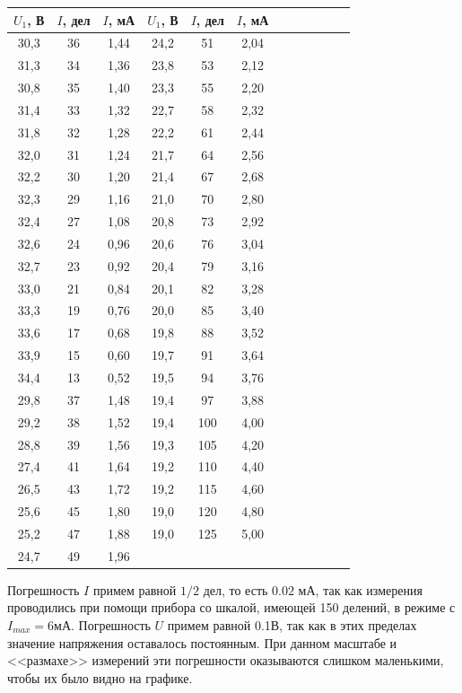 \documentclass[14pt]{article}
\begin{document}
\begin{center}
\begin{tabular}{|c|c|c|c|c|c|c|c|c|c|c|c|}
\hline
$U_1$, В&$I$, дел&$I$, мА&$U_1$, В&$I$, дел&$I$, мА\\
\hline
30,3&36&1,44&24,2&51&2,04\\
\hline
31,3&34&1,36&23,8&53&2,12\\
\hline
30,8&35&1,40&23,3&55&2,20\\
\hline
31,4&33&1,32&22,7&58&2,32\\
\hline
31,8&32&1,28&22,2&61&2,44\\
\hline
32,0&31&1,24&21,7&64&2,56\\
\hline
32,2&30&1,20&21,4&67&2,68\\
\hline
32,3&29&1,16&21,0&70&2,80\\
\hline
32,4&27&1,08&20,8&73&2,92\\
\hline
32,6&24&0,96&20,6&76&3,04\\
\hline
32,7&23&0,92&20,4&79&3,16\\
\hline
33,0&21&0,84&20,1&82&3,28\\
\hline
33,3&19&0,76&20,0&85&3,40\\
\hline
33,6&17&0,68&19,8&88&3,52\\
\hline
33,9&15&0,60&19,7&91&3,64\\
\hline
34,4&13&0,52&19,5&94&3,76\\
\hline
29,8&37&1,48&19,4&97&3,88\\
\hline
29,2&38&1,52&19,4&100&4,00\\
\hline
28,8&39&1,56&19,3&105&4,20\\
\hline
27,4&41&1,64&19,2&110&4,40\\
\hline
26,5&43&1,72&19,2&115&4,60\\
\hline
25,6&45&1,80&19,0&120&4,80\\
\hline
25,2&47&1,88&19,0&125&5,00\\
\hline
24,7&49&1,96&&&\\
\hline
\end{tabular}
\end{center}

\vspace{1cm}
Погрешность $I$ примем равной $1/2$ дел, то есть $0.02$ мА, так как измерения проводились при помощи прибора со шкалой, имеющей 150 делений, в режиме с $I_{max} = 6$мА. Погрешность $U$ примем равной 0.1В, так как в этих пределах значение напряжения оставалось постоянным. При данном масштабе и <<размахе>> измерений эти погрешности оказываются слишком маленькими, чтобы их было видно на графике.
\end{document}
